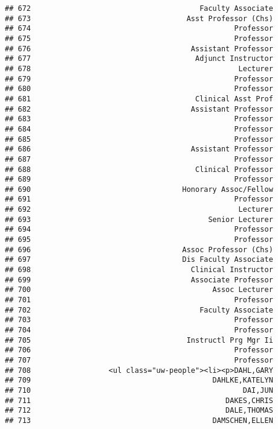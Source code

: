 \documentclass[
]{article}
\begin{document}
\begin{verbatim}
## 672                                       Faculty Associate
## 673                                    Asst Professor (Chs)
## 674                                               Professor
## 675                                               Professor
## 676                                     Assistant Professor
## 677                                      Adjunct Instructor
## 678                                                Lecturer
## 679                                               Professor
## 680                                               Professor
## 681                                      Clinical Asst Prof
## 682                                     Assistant Professor
## 683                                               Professor
## 684                                               Professor
## 685                                               Professor
## 686                                     Assistant Professor
## 687                                               Professor
## 688                                      Clinical Professor
## 689                                               Professor
## 690                                   Honorary Assoc/Fellow
## 691                                               Professor
## 692                                                Lecturer
## 693                                         Senior Lecturer
## 694                                               Professor
## 695                                               Professor
## 696                                   Assoc Professor (Chs)
## 697                                   Dis Faculty Associate
## 698                                     Clinical Instructor
## 699                                     Associate Professor
## 700                                          Assoc Lecturer
## 701                                               Professor
## 702                                       Faculty Associate
## 703                                               Professor
## 704                                               Professor
## 705                                    Instructl Prg Mgr Ii
## 706                                               Professor
## 707                                               Professor
## 708                  <ul class="uw-people"><li><p>DAHL,GARY
## 709                                          DAHLKE,KATELYN
## 710                                                 DAI,JUN
## 711                                             DAKES,CHRIS
## 712                                             DALE,THOMAS
## 713                                          DAMSCHEN,ELLEN

\end{verbatim}
\end{document}
